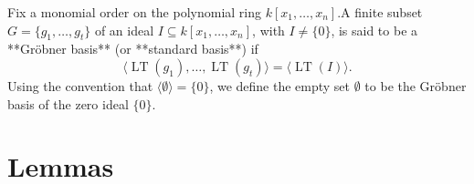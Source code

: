 \begin{definition}\label{Gröbner Basis}
  \leanok
  Fix a monomial order on the polynomial ring $k[x_1, \ldots, x_n]$.A finite subset $G = \{g_1, \ldots, g_t\}$ of an ideal $I \subseteq k[x_1, \ldots, x_n]$, with $I \ne \{0\}$, is said to be a **Gröbner basis** (or **standard basis**) if
  \[
  \langle \operatorname{LT}(g_1), \ldots, \operatorname{LT}(g_t) \rangle = \langle \operatorname{LT}(I) \rangle.
  \]
  Using the convention that $\langle \emptyset \rangle = \{0\}$, we define the empty set $\emptyset$ to be the Gröbner basis of the zero ideal $\{0\}$.
\end{definition}

\begin{definition}\label{S Polynomial}

\end{definition}


\chapter{Lemmas}


